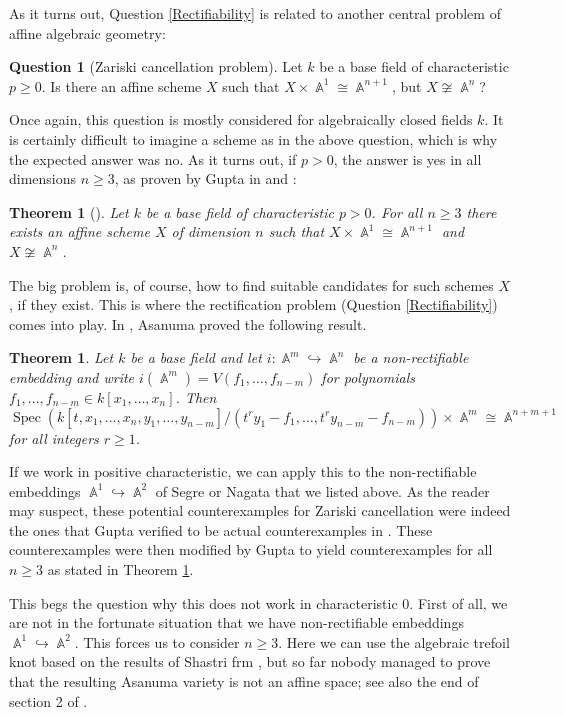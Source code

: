 \documentclass[english]{amsart}
\newtheorem{thm}[prop]{Theorem}
\theoremstyle{definition}
\newtheorem{quest}[prop]{Question}
\DeclareMathOperator{\A}{\mathbb{A}}
\DeclareMathOperator{\Spec}{Spec}
\begin{document}
\hfill

As it turns out, Question \ref{Rectifiability} is related to another central problem of affine algebraic geometry:
\begin{quest}[Zariski cancellation problem]
Let $k$ be a base field of characteristic $p \geq 0$. Is there an affine scheme $X$ such that $X \times \A^1 \cong \A^{n+1}$, but $X \not\cong \A^n$?
\end{quest}
Once again, this question is mostly considered for algebraically closed fields $k$. It is certainly difficult to imagine a scheme as in the above question, which is why the expected answer was no. As it turns out, if $p > 0$, the answer is yes in all dimensions $n \geq 3$, as proven by Gupta in \cite{MR3148104} and \cite{MR3250286}:
\begin{thm}[{\cite[Theorem 3.6]{MR3250286}}]\label{Gupta}
Let $k$ be a base field of characteristic $p > 0$. For all $n \geq 3$ there exists an affine scheme $X$ of dimension $n$ such that $X \times \A^1 \cong \A^{n+1}$ and $X \not \cong \A^n$.
\end{thm}
The big problem is, of course, how to find suitable candidates for such schemes $X$, if they exist. This is where the rectification problem (Question \ref{Rectifiability}) comes into play. In \cite{MR1720185}, Asanuma proved the following result.
\begin{thm}\label{Asanuma}
Let $k$ be a base field and let $i \colon \A^m \hookrightarrow \A^n$ be a non-rectifiable embedding and write $i(\A^m) = V(f_1,\dotsc,f_{n-m})$ for polynomials $f_1,\dotsc,f_{n-m} \in k[x_1,\dotsc,x_n]$. Then 
$$\Spec(k[t,x_1,\dotsc,x_n,y_1,\dotsc,y_{n-m}]/(t^ry_1 - f_1,\dotsc,t^ry_{n-m}-f_{n-m})) \times \A^m \cong \A^{n+m+1}$$
for all integers $r \geq 1$. 
\end{thm}
If we work in positive characteristic, we can apply this to the non-rectifiable embeddings $\A^1 \hookrightarrow \A^2$ of Segre \cite{MR95175} or Nagata \cite{MR337962} that we listed above. As the reader may suspect, these potential counterexamples for Zariski cancellation were indeed the ones that Gupta verified to be actual counterexamples in \cite{MR3148104}. These counterexamples were then modified by Gupta \cite{MR3250286} to yield counterexamples for all $n \geq 3$ as stated in Theorem \ref{Gupta}.

\hfill

This begs the question why this does not work in characteristic $0$. First of all, we are not in the fortunate situation that we have non-rectifiable embeddings $\A^1 \hookrightarrow \A^2$. This forces us to consider $n \geq 3$. Here we can use the algebraic trefoil knot based on the results of Shastri frm \cite{MR1145717}, but so far nobody managed to prove that the resulting Asanuma variety is not an affine space; see also the end of section 2 of \cite{zbMATH07823034}. 
\end{document}
